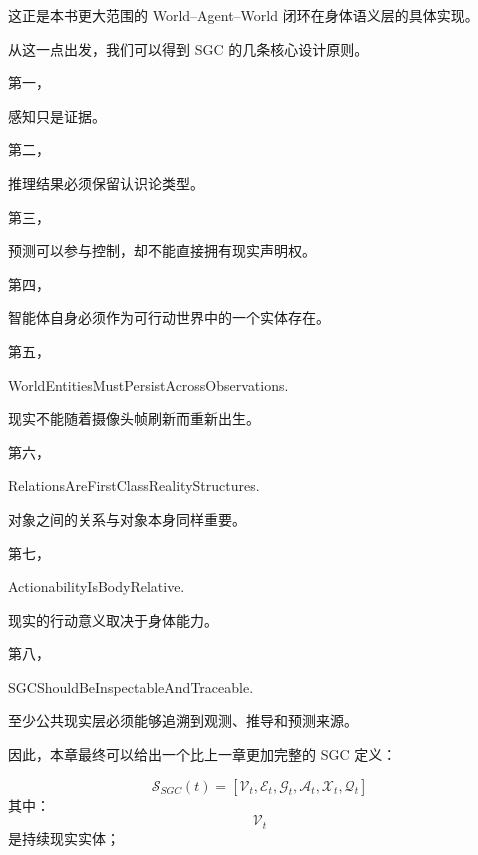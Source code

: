 这正是本书更大范围的 World--Agent--World 闭环在身体语义层的具体实现。

从这一点出发，我们可以得到 SGC 的几条核心设计原则。

第一，
\begin{statementbox}
\centering
{}
\end{statementbox}
感知只是证据。

第二，
\begin{statementbox}
\centering
{}
\end{statementbox}
推理结果必须保留认识论类型。

第三，
\begin{statementbox}
\centering
{}
\end{statementbox}
预测可以参与控制，却不能直接拥有现实声明权。

第四，
\begin{statementbox}
\centering
{}
\end{statementbox}
智能体自身必须作为可行动世界中的一个实体存在。

第五，
\begin{statementbox}
WorldEntitiesMustPersistAcrossObservations.
\end{statementbox}
现实不能随着摄像头帧刷新而重新出生。

第六，
\begin{statementbox}
RelationsAreFirstClassRealityStructures.
\end{statementbox}
对象之间的关系与对象本身同样重要。

第七，
\begin{statementbox}
ActionabilityIsBodyRelative.
\end{statementbox}
现实的行动意义取决于身体能力。

第八，
\begin{statementbox}
SGCShouldBeInspectableAndTraceable.
\end{statementbox}
至少公共现实层必须能够追溯到观测、推导和预测来源。

因此，本章最终可以给出一个比上一章更加完整的 SGC 定义：

\[
\boxed{
\mathcal S_{SGC}(t)
=
\left[
\mathcal V_t,
\mathcal E_t,
\mathcal G_t,
\mathcal A_t,
\mathcal X_t,
\mathcal Q_t
\right]
}
\]
其中：
\[
\mathcal V_t
\]
是持续现实实体；

